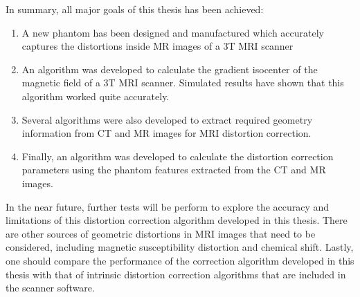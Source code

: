 In summary, all major goals of this thesis has been achieved:
\begin{enumerate}
\item A new phantom has been designed and manufactured which accurately captures the distortions inside MR 
  images of a 3T MRI scanner
\item An algorithm was developed to calculate the gradient isocenter of the magnetic field of a 3T MRI scanner. 
  Simulated results have shown that this algorithm worked quite accurately.
\item Several algorithms were also developed to extract required geometry information from CT and MR images 
  for MRI distortion correction.
\item Finally, an algorithm was developed to calculate the distortion correction parameters 
  using the phantom features extracted from the CT and MR images.
\end{enumerate}

In the near future, further tests will be perform to explore the accuracy and limitations of this 
distortion correction algorithm developed in this thesis. There are other sources of geometric distortions in 
MRI images that need to be considered, including magnetic susceptibility distortion and chemical shift.
Lastly, one should compare the performance of the correction algorithm developed in this thesis with that of 
intrinsic distortion correction algorithms that are included in the scanner software.
